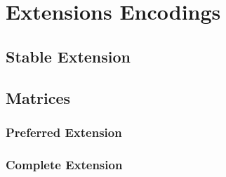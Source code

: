\section{Extensions Encodings}
\subsection{Stable Extension}


\subsection{Matrices}
\subsubsection{Preferred Extension}
\subsubsection{Complete Extension}